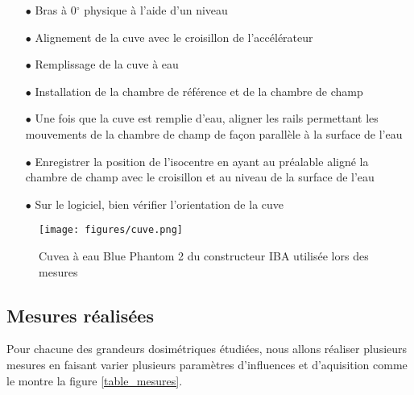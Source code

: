 \documentclass{book}
\begin{document}
\begin{itemize}
  \item[$\bullet$] Bras à 0$^{\circ}$ physique à l'aide d'un niveau 
  \item[$\bullet$] Alignement de la cuve avec le croisillon de l'accélérateur
  \item[$\bullet$] Remplissage de la cuve à eau
  \item[$\bullet$] Installation de la chambre de référence et de la chambre de champ
  \item[$\bullet$] Une fois que la cuve est remplie d'eau, aligner les rails permettant les mouvements de la chambre de champ de façon parallèle à la surface de l'eau
  \item[$\bullet$] Enregistrer la position de l'isocentre en ayant au préalable aligné la chambre de champ avec le croisillon et au niveau de la surface de l'eau
  \item[$\bullet$] Sur le logiciel, bien vérifier l'orientation de la cuve
\end{itemize}

\begin{figure}[h]
  \centering
  \texttt{[image: figures/cuve.png]}
  \caption{Cuvea à eau Blue Phantom 2 du constructeur IBA utilisée lors des mesures}
  \label{fig_cuve}
\end{figure}

\subsection{Mesures réalisées}

Pour chacune des grandeurs dosimétriques étudiées, nous allons réaliser plusieurs mesures en faisant varier plusieurs paramètres d'influences et d'aquisition comme le montre la figure \ref*{table_mesures}.
\end{document}
